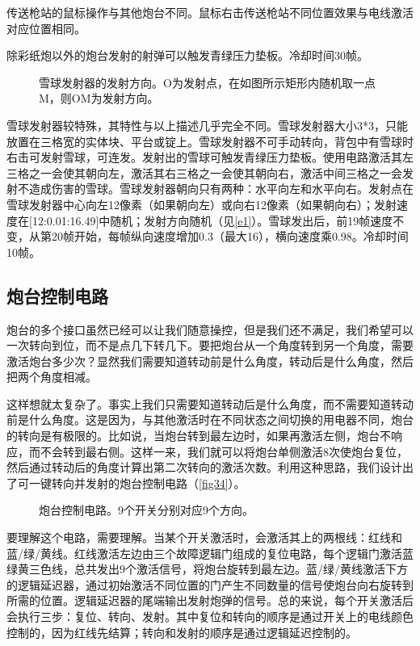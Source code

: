传送枪站的鼠标操作与其他炮台不同。鼠标右击传送枪站不同位置效果与电线激活对应位置相同。

除彩纸炮以外的炮台发射的射弹可以触发青绿压力垫板。冷却时间30帧。

\begin{figure}[!ht]
  \centering
  \caption{雪球发射器的发射方向。O为发射点，在如图所示矩形内随机取一点M，则OM为发射方向。}\label{e1}
\end{figure}
雪球发射器较特殊，其特性与以上描述几乎完全不同。雪球发射器大小3*3，只能放置在三格宽的实体块、平台或锭上。雪球发射器不可手动转向，背包中有雪球时右击可发射雪球，可连发。发射出的雪球可触发青绿压力垫板。使用电路激活其左三格之一会使其朝向左，激活其右三格之一会使其朝向右，激活中间三格之一会发射不造成伤害的雪球。雪球发射器朝向只有两种：水平向左和水平向右。发射点在雪球发射器中心向左12像素（如果朝向左）或向右12像素（如果朝向右）；发射速度在[12:0.01:16.49]中随机；发射方向随机（见\autoref{e1}）。雪球发出后，前19帧速度不变，从第20帧开始，每帧纵向速度增加0.3（最大16），横向速度乘0.98。冷却时间10帧。

\subsection{炮台控制电路}
炮台的多个接口虽然已经可以让我们随意操控，但是我们还不满足，我们希望可以一次转向到位，而不是点几下转几下。要把炮台从一个角度转到另一个角度，需要激活炮台多少次？显然我们需要知道转动前是什么角度，转动后是什么角度，然后把两个角度相减。

这样想就太复杂了。事实上我们只需要知道转动后是什么角度，而不需要知道转动前是什么角度。这是因为，与其他激活时在不同状态之间切换的用电器不同，炮台的转向是有极限的。比如说，当炮台转到最左边时，如果再激活左侧，炮台不响应，而不会转到最右侧。这样一来，我们就可以将炮台单侧激活8次使炮台复位，然后通过转动后的角度计算出第二次转向的激活次数。利用这种思路，我们设计出了可一键转向并发射的炮台控制电路（\autoref{fig34}）。

\begin{figure}[!ht]
  \centering
  \caption{炮台控制电路。9个开关分别对应9个方向。}\label{fig34}
\end{figure}

要理解这个电路，需要理解。当某个开关激活时，会激活其上的两根线：红线和蓝/绿/黄线。红线激活左边由三个故障逻辑门组成的复位电路，每个逻辑门激活蓝绿黄三色线，总共发出9个激活信号，将炮台旋转到最左边。蓝/绿/黄线激活下方的逻辑延迟器，通过初始激活不同位置的门产生不同数量的信号使炮台向右旋转到所需的位置。逻辑延迟器的尾端输出发射炮弹的信号。总的来说，每个开关激活后会执行三步：复位、转向、发射。其中复位和转向的顺序是通过开关上的电线颜色控制的，因为红线先结算；转向和发射的顺序是通过逻辑延迟控制的。

